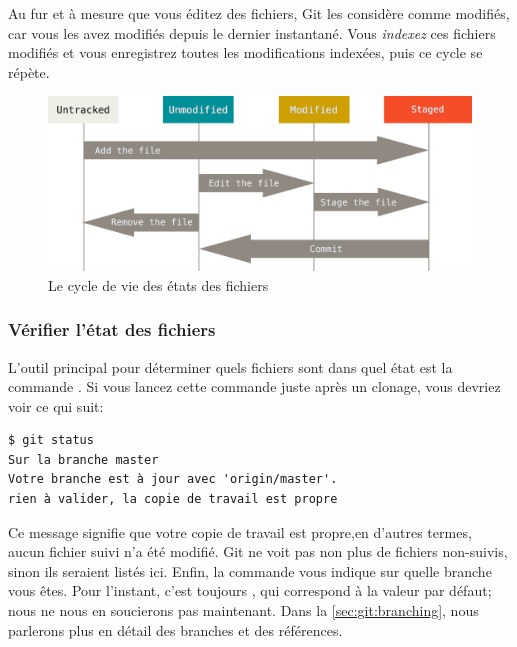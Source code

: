 Au fur et à mesure que vous éditez des fichiers, Git les considère comme modifiés, car vous les avez modifiés depuis le dernier instantané.
Vous \emph{indexez} ces fichiers modifiés et vous enregistrez toutes les modifications indexées, puis ce cycle se répète.

\begin{figure}[H]
  \centering
  \includegraphics{images/lifecycle}
  \caption{Le cycle de vie des états des fichiers}
  \label{fig:git:lifecycle}
\end{figure}

\subsubsection{Vérifier l'état des fichiers}
\label{sec:git:checking_status}

L'outil principal pour déterminer quels fichiers sont dans quel état est la commande .
Si vous lancez cette commande juste après un clonage, vous devriez voir ce qui suit:
\begin{Schunk}
\begin{Verbatim}
$ git status
Sur la branche master
Votre branche est à jour avec 'origin/master'.
rien à valider, la copie de travail est propre
\end{Verbatim}
\end{Schunk}

Ce message signifie que votre copie de travail est propre,en d'autres termes, aucun fichier suivi n'a été modifié.
Git ne voit pas non plus de fichiers non-suivis, sinon ils seraient listés ici.
Enfin, la commande vous indique sur quelle branche vous êtes.
Pour l'instant, c'est toujours , qui correspond à la valeur par défaut; nous ne nous en soucierons pas maintenant.
Dans la \autoref{sec:git:branching}, nous parlerons plus en détail des branches et des références.

